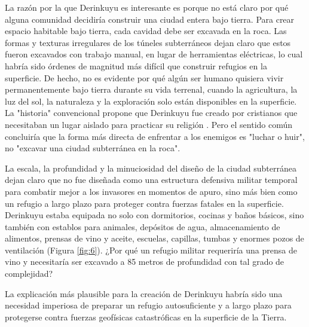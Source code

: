 \documentclass[10pt,twocolumn,letterpaper]{article}
\begin{document}
La razón por la que Derinkuyu es interesante es porque no está claro por qué alguna comunidad decidiría construir una ciudad entera bajo tierra. Para crear espacio habitable bajo tierra, cada cavidad debe ser excavada en la roca. Las formas y texturas irregulares de los túneles subterráneos dejan claro que estos fueron excavados con trabajo manual, en lugar de herramientas eléctricas, lo cual habría sido órdenes de magnitud más difícil que construir refugios en la superficie. De hecho, no es evidente por qué algún ser humano quisiera vivir permanentemente bajo tierra durante su vida terrenal, cuando la agricultura, la luz del sol, la naturaleza y la exploración solo están disponibles en la superficie. La "historia" convencional propone que Derinkuyu fue creado por cristianos que necesitaban un lugar aislado para practicar su religión \cite{53}. Pero el sentido común concluiría que la forma más directa de enfrentar a los enemigos es "luchar o huir", no "excavar una ciudad subterránea en la roca".

La escala, la profundidad y la minuciosidad del diseño de la ciudad subterránea dejan claro que no fue diseñada como una estructura defensiva militar temporal para combatir mejor a los invasores en momentos de apuro, sino más bien como un refugio a largo plazo para proteger contra fuerzas fatales en la superficie. Derinkuyu estaba equipada no solo con dormitorios, cocinas y baños básicos, sino también con establos para animales, depósitos de agua, almacenamiento de alimentos, prensas de vino y aceite, escuelas, capillas, tumbas y enormes pozos de ventilación (Figura \ref{fig:6}). ¿Por qué un refugio militar requeriría una prensa de vino y necesitaría ser excavado a 85 metros de profundidad con tal grado de complejidad?

La explicación más plausible para la creación de Derinkuyu habría sido una necesidad imperiosa de preparar un refugio autosuficiente y a largo plazo para protegerse contra fuerzas geofísicas catastróficas en la superficie de la Tierra.
\end{document}
